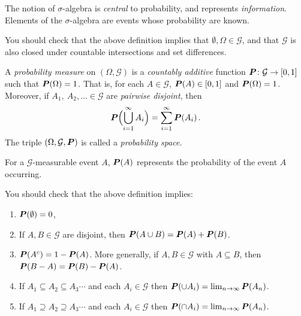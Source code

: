 \begin{remark}
  The notion of $\sigma$-algebra is \emph{central} to probability, and represents \emph{information}.
  Elements of the $\sigma$-algebra are events whose probability are known.
\end{remark}

\begin{remark}
  You should check that the above definition implies that $\emptyset, \Omega \in \mathcal G$, and that $\mathcal G$ is also closed under countable intersections and set differences.
\end{remark}

\begin{definition}
  A \emph{probability measure} on $(\Omega, \mathcal G)$ is a \emph{countably additive} function $\P\colon \mathcal G \to [0, 1]$ such that $\P(\Omega) = 1$.
  That is, for each $A \in \mathcal G$, $\P(A) \in [0, 1]$ and $\P(\Omega) = 1$.
  Moreover, if $A_1,\ A_2, \dots \in \mathcal G$ are \emph{pairwise disjoint}, then
  \begin{equation*}
    \P\paren[\Big]{ \bigcup_{i = 1}^\infty A_i } = \sum_{i=1}^\infty \P(A_i)\,.
  \end{equation*}
  The triple $(\Omega, \mathcal G, \P)$ is called a \emph{probability space}.
\end{definition}

\begin{remark}
For a $\mathcal G$-measurable event $A$, $\P(A)$ represents the probability of the event $A$ occurring.
\end{remark}

\begin{remark}
  You should check that the above definition implies:
  \begin{enumerate}
    \item
      $\P(\emptyset) = 0$,
    \item
      If $A, B \in \mathcal G$ are disjoint, then $\P(A \cup B) = \P(A) + \P(B)$.
    \item
      $\P(A^c) = 1 - \P(A)$.
      More generally, if $A, B \in \mathcal G$ with $A \subseteq B$, then $\P(B - A) = \P(B) - \P(A)$.
    \item
      If $A_1 \subseteq A_2 \subseteq A_3 \cdots$ and each $A_i \in \mathcal G$ then $\P(\cup A_i) = \lim_{n \to \infty} \P(A_n)$.
    \item
      If $A_1 \supseteq A_2 \supseteq A_3 \cdots$ and each $A_i \in \mathcal G$ then $\P(\cap A_i) = \lim_{n \to \infty} \P(A_n)$.
  \end{enumerate}
\end{remark}

